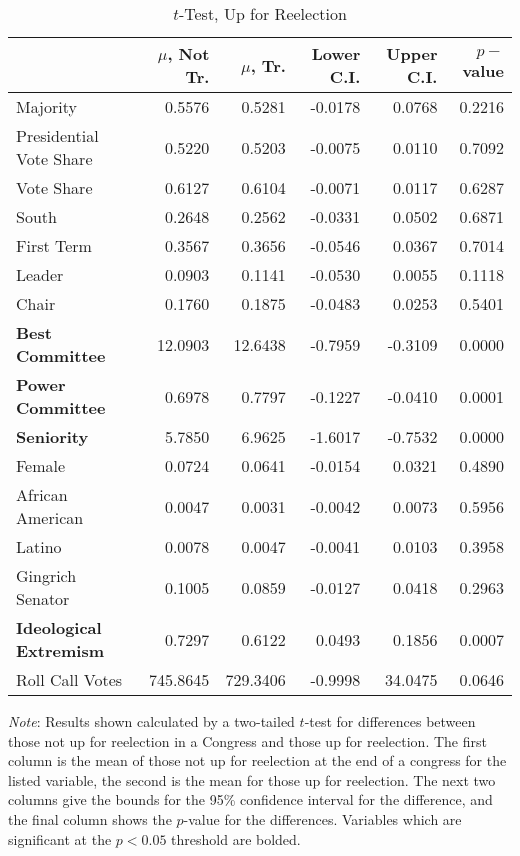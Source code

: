\documentclass[12pt]{article}
\newcommand\fnote[1]{\captionsetup{font=small}\caption*{#1}}
\begin{document}
\begin{table}[H]
	\centering
	\caption{$t$-Test, Up for Reelection} 
	\begin{tabular}{lrrrrr}
		\hline
		& $ \mu $, Not Tr. & $ \mu $, Tr. & Lower C.I. & Upper C.I. & $p-$value \\ 
		\hline
		Majority & 0.5576 & 0.5281 & -0.0178 & 0.0768 & 0.2216 \\ 
		Presidential Vote Share & 0.5220 & 0.5203 & -0.0075 & 0.0110 & 0.7092 \\ 
		Vote Share & 0.6127 & 0.6104 & -0.0071 & 0.0117 & 0.6287 \\ 
		South & 0.2648 & 0.2562 & -0.0331 & 0.0502 & 0.6871 \\ 
		First Term & 0.3567 & 0.3656 & -0.0546 & 0.0367 & 0.7014 \\ 
		Leader & 0.0903 & 0.1141 & -0.0530 & 0.0055 & 0.1118 \\ 
		Chair & 0.1760 & 0.1875 & -0.0483 & 0.0253 & 0.5401 \\ 
		\textbf{Best Committee} & 12.0903 & 12.6438 & -0.7959 & -0.3109 & 0.0000 \\ 
		\textbf{Power Committee} & 0.6978 & 0.7797 & -0.1227 & -0.0410 & 0.0001 \\ 
		\textbf{Seniority} & 5.7850 & 6.9625 & -1.6017 & -0.7532 & 0.0000 \\ 
		Female & 0.0724 & 0.0641 & -0.0154 & 0.0321 & 0.4890 \\ 
		African American & 0.0047 & 0.0031 & -0.0042 & 0.0073 & 0.5956 \\ 
		Latino & 0.0078 & 0.0047 & -0.0041 & 0.0103 & 0.3958 \\ 
		Gingrich Senator & 0.1005 & 0.0859 & -0.0127 & 0.0418 & 0.2963 \\ 
		\textbf{Ideological Extremism} & 0.7297 & 0.6122 & 0.0493 & 0.1856 & 0.0007 \\ 
		Roll Call Votes & 745.8645 & 729.3406 & -0.9998 & 34.0475 & 0.0646 \\ 
		\hline
	\end{tabular}
	\fnote{\textit{Note}: Results shown calculated by a two-tailed $t$-test for differences between those not up for reelection in a Congress and those up for reelection. The first column is the mean of those not up for reelection at the end of a congress for the listed variable, the second is the mean for those up for reelection. The next two columns give the bounds for the 95\% confidence interval for the difference, and the final column shows the $p$-value for the differences. Variables which are significant at the $ p < 0.05 $ threshold are bolded.}
\end{table}
\end{document}
